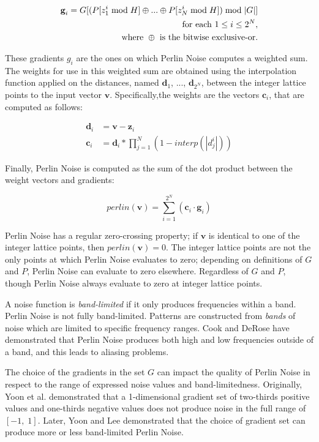 \documentclass[12pt]{article}
\theoremstyle{definition}
\theoremstyle{remark}
\begin{document}
\begin{align*}
	\textbf{g}_i = G[(P[z^i_1 \; \textnormal{mod} \; H] \oplus ... \oplus P[z^i_N \; \textnormal{mod} \; H]) \; \textnormal{mod} \; |G|] \\
	\textnormal{for each } 1 \leq i \leq 2^N, \\
	\textnormal{where } \oplus \textnormal{ is the bitwise exclusive-or.}
\end{align*}

These gradients $g_i$ are the ones on which Perlin Noise computes a weighted sum. The weights for use in this weighted sum are obtained using the interpolation function applied on the distances, named $\textbf{d}_1$, ..., $\textbf{d}_{2^N}$, between the integer lattice points to the input vector $\textbf{v}$. Specifically,the weights are the vectors $\textbf{c}_i$, that are computed as follows:

\begin{align*}
	\textbf{d}_i &= \textbf{v} - \textbf{z}_i\\
	\textbf{c}_i &= \textbf{d}_i * \prod_{j=1}^{N}(1-interp(|d^i_j|))
\end{align*}

Finally, Perlin Noise is computed as the sum of the dot product between the weight vectors and gradients:

\begin{equation*}
	perlin(\textbf{v}) = \sum_{i=1}^{2^N}(\textbf{c}_i \cdot \textbf{g}_i)
\end{equation*}

Perlin Noise has a regular zero-crossing property; if $\textbf{v}$ is identical to one of the integer lattice points, then $perlin(\textbf{v})=0$. The integer lattice points are not the only points at which Perlin Noise evaluates to zero; depending on definitions of $G$ and $P$, Perlin Noise can evaluate to zero elsewhere. Regardless of $G$ and $P$, though Perlin Noise always evaluate to zero at integer lattice points.

A noise function is \textit{band-limited} if it only produces frequencies within a band. Perlin Noise is not fully band-limited\cite{cookderose2005}. Patterns are constructed from \textit{bands} of noise which are limited to specific frequency ranges. Cook and DeRose have demonstrated that Perlin Noise produces both high and low frequencies outside of a band, and this leads to aliasing problems.

The choice of the gradients in the set $G$ can impact the quality of Perlin Noise in respect to the range of expressed noise values and band-limitedness. Originally,  Yoon et al.\cite{yoonetal2004} demonstrated that a 1-dimensional gradient set of two-thirds positive values and one-thirds negative values does not produce noise in the full range of $[-1, \; 1]$. Later, Yoon and Lee\cite{yoonlee2008} demonstrated that the choice of gradient set can produce more or less band-limited Perlin Noise.
\end{document}
